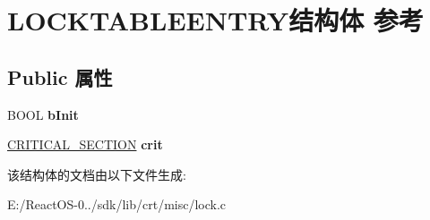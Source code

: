 \hypertarget{struct_l_o_c_k_t_a_b_l_e_e_n_t_r_y}{}\section{L\+O\+C\+K\+T\+A\+B\+L\+E\+E\+N\+T\+R\+Y结构体 参考}
\label{struct_l_o_c_k_t_a_b_l_e_e_n_t_r_y}
\subsection*{Public 属性}
\begin{DoxyCompactItemize}
\item 
\mbox{\label{struct_l_o_c_k_t_a_b_l_e_e_n_t_r_y_ab05fe67c43e0f87b644548a7df640d24}} 
B\+O\+OL {\bfseries b\+Init}
\item 
\mbox{\label{struct_l_o_c_k_t_a_b_l_e_e_n_t_r_y_a16e296e5bf72c42bd9aa2e587f9c05c1}} 
\hyperlink{struct___c_r_i_t_i_c_a_l___s_e_c_t_i_o_n}{C\+R\+I\+T\+I\+C\+A\+L\+\_\+\+S\+E\+C\+T\+I\+ON} {\bfseries crit}
\end{DoxyCompactItemize}


该结构体的文档由以下文件生成\+:\begin{DoxyCompactItemize}
\item 
E\+:/\+React\+O\+S-\/0../sdk/lib/crt/misc/lock.\+c\end{DoxyCompactItemize}
